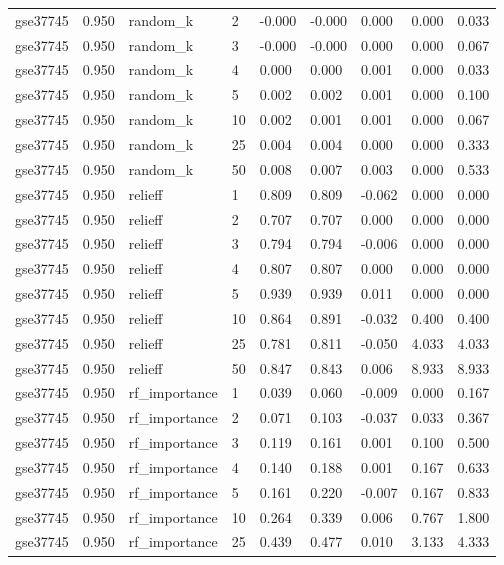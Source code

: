 \begin{table}[t]
\begin{tabular}{lllllllll}
    gse37745 & 0.950 & random\_k & 2 & -0.000 & -0.000 & 0.000 & 0.000 & 0.033 \\
    gse37745 & 0.950 & random\_k & 3 & -0.000 & -0.000 & 0.000 & 0.000 & 0.067 \\
    gse37745 & 0.950 & random\_k & 4 & 0.000 & 0.000 & 0.001 & 0.000 & 0.033 \\
    gse37745 & 0.950 & random\_k & 5 & 0.002 & 0.002 & 0.001 & 0.000 & 0.100 \\
    gse37745 & 0.950 & random\_k & 10 & 0.002 & 0.001 & 0.001 & 0.000 & 0.067 \\
    gse37745 & 0.950 & random\_k & 25 & 0.004 & 0.004 & 0.000 & 0.000 & 0.333 \\
    gse37745 & 0.950 & random\_k & 50 & 0.008 & 0.007 & 0.003 & 0.000 & 0.533 \\
    gse37745 & 0.950 & relieff & 1 & 0.809 & 0.809 & -0.062 & 0.000 & 0.000 \\
    gse37745 & 0.950 & relieff & 2 & 0.707 & 0.707 & 0.000 & 0.000 & 0.000 \\
    gse37745 & 0.950 & relieff & 3 & 0.794 & 0.794 & -0.006 & 0.000 & 0.000 \\
    gse37745 & 0.950 & relieff & 4 & 0.807 & 0.807 & 0.000 & 0.000 & 0.000 \\
    gse37745 & 0.950 & relieff & 5 & 0.939 & 0.939 & 0.011 & 0.000 & 0.000 \\
    gse37745 & 0.950 & relieff & 10 & 0.864 & 0.891 & -0.032 & 0.400 & 0.400 \\
    gse37745 & 0.950 & relieff & 25 & 0.781 & 0.811 & -0.050 & 4.033 & 4.033 \\
    gse37745 & 0.950 & relieff & 50 & 0.847 & 0.843 & 0.006 & 8.933 & 8.933 \\
    gse37745 & 0.950 & rf\_importance & 1 & 0.039 & 0.060 & -0.009 & 0.000 & 0.167 \\
    gse37745 & 0.950 & rf\_importance & 2 & 0.071 & 0.103 & -0.037 & 0.033 & 0.367 \\
    gse37745 & 0.950 & rf\_importance & 3 & 0.119 & 0.161 & 0.001 & 0.100 & 0.500 \\
    gse37745 & 0.950 & rf\_importance & 4 & 0.140 & 0.188 & 0.001 & 0.167 & 0.633 \\
    gse37745 & 0.950 & rf\_importance & 5 & 0.161 & 0.220 & -0.007 & 0.167 & 0.833 \\
    gse37745 & 0.950 & rf\_importance & 10 & 0.264 & 0.339 & 0.006 & 0.767 & 1.800 \\
    gse37745 & 0.950 & rf\_importance & 25 & 0.439 & 0.477 & 0.010 & 3.133 & 4.333 \\

\end{tabular}
\end{table}
